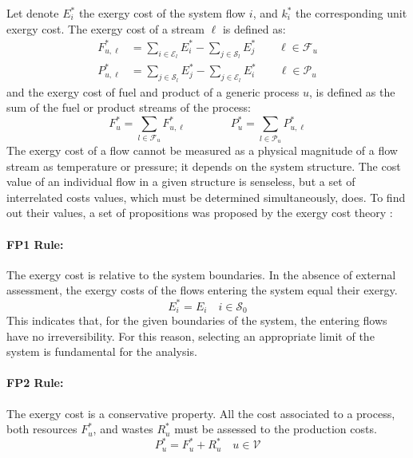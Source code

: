 \documentclass{ecos2018}
\begin{document}
Let denote $E_i^*$ the exergy cost of the system flow $i$, and $k_i^*$ the corresponding unit exergy cost. The exergy cost of a stream $\ell$ is defined as:
\begin{align}
F_{u,\ell}^{*}&=\sum_{i\in\mathcal{E}_l}{E_i^*}-\sum_{j\in\mathcal{S}_l}{E_j^*} \qquad \ell\in\mathcal{F}_u \\
P_{u,\ell}^{*}&=\sum_{j\in\mathcal{S}_l}{E_j^*}-\sum_{j\in\mathcal{E}_l}{E_i^*} \qquad \ell\in\mathcal{P}_u
\end{align}
and the exergy cost of fuel and product of a generic process $u$, is defined as the sum of the fuel or product streams of the process:
\begin{equation}
F_{u}^{*}=\sum_{l\in\mathcal{F}_u}{F_{u,\ell}^{*}} \qquad \qquad
P_{u}^{*}=\sum_{l\in\mathcal{P}_u}{P_{u,\ell}^{*}}
\end{equation}
The exergy cost of a flow cannot be measured as a physical magnitude of a flow stream as temperature or pressure; it depends on the system structure. The cost value of an individual flow in a given structure is senseless, but a set of interrelated costs values, which must be determined simultaneously, does. To find out their values, a set of propositions was proposed by the exergy cost theory \cite{Valero1986}:

\paragraph{FP1 Rule:} The exergy cost is relative to the system boundaries. In the absence of external assessment, the exergy costs of the flows entering the system equal their exergy. 
\begin{equation}
\label{eq:fprule1}
E_i^* = E_{i} \quad i\in\mathcal{S}_0 \tag{FP1}
\end{equation}
This indicates that, for the given boundaries of the system, the entering flows have no irreversibility. For this reason, selecting an appropriate limit of the system is fundamental for the analysis.
\paragraph{FP2 Rule:} The exergy cost is a conservative property. All the cost associated to a process, both resources $F_u^*$, and wastes $R_u^*$ must be assessed to the production costs.
\begin{equation}
\label{eq:fprule2}
P_{u}^{*}=F_{u}^{*}+R_{u}^{*} \quad u\in\mathcal{V} \tag{FP2}
\end{equation}
\end{document}
